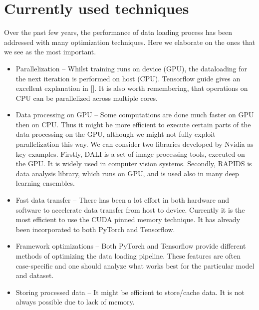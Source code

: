 \documentclass[licencjacka,en]{pracamgr}
\begin{document}
\section*{Currently used techniques}
Over the past few years, the performance of data loading process has been addressed with many optimization techniques. Here we elaborate on the ones that we see as the most important.
\begin{itemize}

\item Parallelization -- Whilst training runs on device (GPU), the dataloading for the next iteration is performed on host (CPU). Tensorflow guide gives an excellent explanation in []. It is also worth remembering, that operations on CPU can be parallelized across multiple cores.

\item Data processing on GPU -- Some computations are done much faster on GPU then on CPU. Thus it might be more efficient to execute certain parts of the data processing on the GPU, although we might not fully exploit parallelization this way. We can consider two libraries developed by Nvidia as key examples. Firstly, DALI  is a set of image processing tools, executed on the GPU. It is widely used in computer vision systems. Secondly, RAPIDS is data analysis library, which runs on GPU, and is used also in many deep learning ensembles.

\item  Fast data transfer -- There has been a lot effort in both hardware and software to accelerate data transfer from host to device. Currently it is the most efficient to use the CUDA pinned memory technique. It has already been incorporated to both PyTorch and Tensorflow.

\item Framework optimizations -- Both PyTorch and Tensorflow provide different methods of optimizing the data loading pipeline. These features are often case-specific and one should analyze what works best for the particular model and dataset.

\item Storing processed data -- It might be efficient to store/cache data. It is not always possible due to lack of memory.

\end{itemize}
\end{document}
